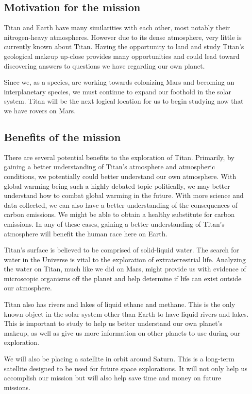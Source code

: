 \documentclass[conf]{new-aiaa}
\begin{document}
\subsection{Motivation for the mission}
\par Titan and Earth have many similarities with each other, most notably their nitrogen-heavy atmospheres. However due to its dense atmosphere, very little is currently known about Titan.  Having the opportunity to land and study Titan's geological makeup up-close provides many opportunities and could lead toward discovering answers to questions we have regarding our own planet.\\
\par Since we, as a species, are working towards colonizing Mars and becoming an interplanetary species, we must continue to expand our foothold in the solar system.  Titan will be the next logical location for us to begin studying now that we have rovers on Mars.
\subsection{Benefits of the mission}
\par There are several potential benefits to the exploration of Titan.  Primarily, by gaining a better understanding of Titan's atmosphere and atmospheric conditions, we potentially could better understand our own atmosphere. With global warming being such a highly debated topic politically, we may better understand how to combat global warming in the future.  With more science and data collected, we can also have a better understanding of the consequences of carbon emissions.  We might be able to obtain a healthy substitute for carbon emissions. In any of these cases, gaining a better understanding of Titan's atmosphere will benefit the human race here on Earth.\\
\par Titan's surface is believed to be comprised of solid-liquid water. The search for water in the Universe is vital to the exploration of extraterrestrial life. Analyzing the water on Titan, much like we did on Mars, might provide us with evidence of microscopic organisms off the planet and help determine if life can exist outside our atmosphere.\\
\par Titan also has rivers and lakes of liquid ethane and methane.  This is the only known object in the solar system other than Earth to have liquid rivers and lakes.  This is important to study to help us better understand our own planet's makeup, as well as give us more information on other planets to use during our exploration.\\
\par We will also be placing a satellite in orbit around Saturn.  This is a long-term satellite designed to be used for future space explorations.  It will not only help us accomplish our mission but will also help save time and money on future missions.
\end{document}
